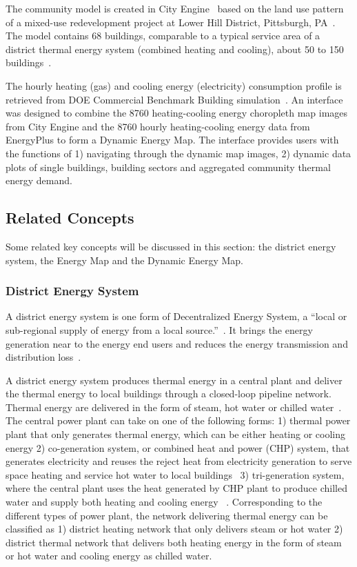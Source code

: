 \documentclass[hidelinks,12pt]{article}
\begin{document}
The community model is created in City Engine~\cite{cityEngine2015}
based on the land use pattern of a mixed-use redevelopment project at
Lower Hill District, Pittsburgh, PA~\cite{Ramesh2013}. The model
contains 68 buildings, comparable to a typical service area of a
district thermal energy system (combined heating and cooling), about
50 to 150 buildings~\cite{IDEA2005}.

The hourly heating (gas) and cooling energy (electricity) consumption
profile is retrieved from DOE Commercial Benchmark Building
simulation~\cite{DOE2015}. An interface was designed to combine the
8760 heating-cooling energy choropleth map images from City Engine and
the 8760 hourly heating-cooling energy data from EnergyPlus to form a
Dynamic Energy Map. The interface provides users with the functions of
1) navigating through the dynamic map images, 2) dynamic data
plots of single buildings, building sectors and aggregated community
thermal energy demand.

\subsection{Related Concepts}\label{concept}
Some related key concepts will be discussed in this section: the
district energy system, the Energy Map and the Dynamic Energy Map.

\subsubsection{District Energy System}
A district energy system is one form of Decentralized Energy System, a
``local or sub-regional supply of energy from a local
source.''~\cite{lhmreport2012}. It brings the energy generation near
to the energy end users and reduces the energy transmission and
distribution loss~\cite{decentralHeatMap2011}.

A district energy system produces thermal energy in a central plant
and deliver the thermal energy to local buildings through a
closed-loop pipeline network. Thermal energy are delivered in the form
of steam, hot water or chilled water~\cite{baird2014}. The central
power plant can take on one of the following forms: 1) thermal power
plant that only generates thermal energy, which can be either heating
or cooling energy 2) co-generation system, or combined heat and power
(CHP) system, that generates electricity and reuses the reject heat
from electricity generation to serve space heating and service hot
water to local buildings~\cite{IDEA2005} 3) tri-generation system,
where the central plant uses the heat generated by CHP plant to
produce chilled water and supply both heating and cooling energy
~\cite{cchp2015}. Corresponding to the different types of power plant,
the network delivering thermal energy can be classified as 1) district
heating network that only delivers steam or hot water 2) district
thermal network that delivers both heating energy in the form of steam
or hot water and cooling energy as chilled water.
\end{document}
